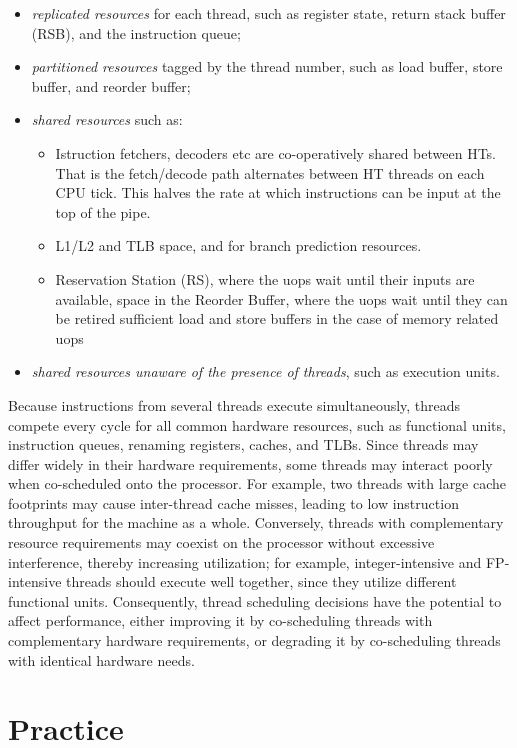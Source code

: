 \documentclass[12pt]{article}
\begin{document}
\begin{itemize}
	\item {\em replicated resources} for each thread, such as register state, return stack buffer (RSB), and the instruction queue; 
    \item {\em partitioned resources} tagged by the thread number, such as load buffer, store buffer, and reorder buffer;
    \item {\em shared resources} such as:
    \begin{itemize}
    		\item Istruction fetchers, decoders etc are co-operatively shared between HTs. That is the fetch/decode path alternates between HT threads on each CPU tick. This halves the rate at which instructions can be input at the top of the pipe.
    		\item L1/L2 and TLB space, and for branch prediction resources.
    		\item Reservation Station (RS), where the uops wait until their inputs are available, space in the Reorder Buffer, where the uops wait until they can be retired sufficient load and store buffers in the case of memory related uops
    \end{itemize}
    \item {\em shared resources unaware of the presence of threads}, such as execution units.
\end{itemize}

Because instructions from several threads execute simultaneously, threads compete every cycle for all common hardware resources, such as functional units, instruction queues, renaming registers, caches, and TLBs. Since threads may differ widely in their hardware requirements, some threads may interact poorly when co-scheduled onto the processor. For example, two threads with large cache footprints may cause inter-thread cache misses, leading to low instruction throughput for the machine as a whole. Conversely, threads with complementary resource requirements may coexist on the processor without excessive interference, thereby increasing utilization; for example, integer-intensive and FP-intensive threads should execute well together, since they utilize different functional units. Consequently, thread scheduling decisions have the potential to affect performance, either improving it by co-scheduling threads with complementary hardware requirements, or degrading it by co-scheduling threads with identical hardware needs\cite{smt}.

\section{Practice}
\end{document}
